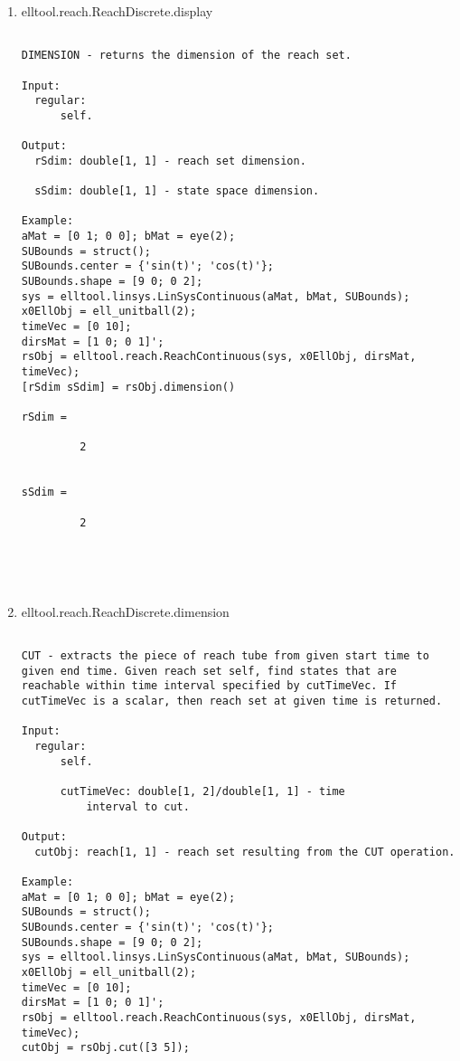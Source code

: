 \begin{enumerate}
\begin{lstlisting}
\end{lstlisting}
\fontfamily{\familydefault}
\selectfont
\item {elltool.reach.ReachDiscrete.display}
\selectfont
\begin{lstlisting}

DIMENSION - returns the dimension of the reach set.

Input:
  regular:
      self.

Output:
  rSdim: double[1, 1] - reach set dimension.

  sSdim: double[1, 1] - state space dimension.

Example:
aMat = [0 1; 0 0]; bMat = eye(2);
SUBounds = struct();
SUBounds.center = {'sin(t)'; 'cos(t)'};
SUBounds.shape = [9 0; 0 2];
sys = elltool.linsys.LinSysContinuous(aMat, bMat, SUBounds);
x0EllObj = ell_unitball(2);
timeVec = [0 10];
dirsMat = [1 0; 0 1]';
rsObj = elltool.reach.ReachContinuous(sys, x0EllObj, dirsMat, timeVec);
[rSdim sSdim] = rsObj.dimension()

rSdim =

         2


sSdim =

         2





\end{lstlisting}
\fontfamily{\familydefault}
\selectfont
\item {elltool.reach.ReachDiscrete.dimension}
\selectfont
\begin{lstlisting}

CUT - extracts the piece of reach tube from given start time to
given end time. Given reach set self, find states that are
reachable within time interval specified by cutTimeVec. If
cutTimeVec is a scalar, then reach set at given time is returned.

Input:
  regular:
      self.

      cutTimeVec: double[1, 2]/double[1, 1] - time
          interval to cut.

Output:
  cutObj: reach[1, 1] - reach set resulting from the CUT operation.

Example:
aMat = [0 1; 0 0]; bMat = eye(2);
SUBounds = struct();
SUBounds.center = {'sin(t)'; 'cos(t)'};
SUBounds.shape = [9 0; 0 2];
sys = elltool.linsys.LinSysContinuous(aMat, bMat, SUBounds);
x0EllObj = ell_unitball(2);
timeVec = [0 10];
dirsMat = [1 0; 0 1]';
rsObj = elltool.reach.ReachContinuous(sys, x0EllObj, dirsMat, timeVec);
cutObj = rsObj.cut([3 5]);






\end{lstlisting}
\end{enumerate}
